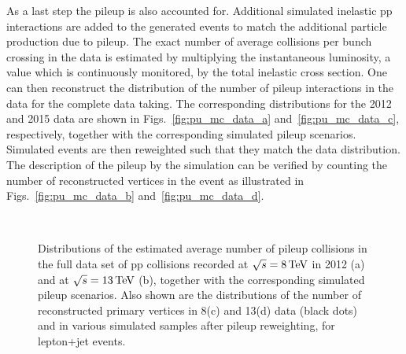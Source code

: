 As a last step the pileup is also accounted for.
Additional simulated inelastic pp interactions are added to the generated events to match the additional particle production due to pileup.
The exact number of average collisions per bunch crossing in the data is estimated by multiplying the instantaneous luminosity, a value which is continuously monitored, by the total inelastic cross section.
One can then reconstruct the distribution of the number of pileup interactions in the data for the complete data taking.
The corresponding distributions for the 2012 and 2015 data are shown in Figs.~\ref{fig:pu_mc_data_a} and~\ref{fig:pu_mc_data_c}, respectively, together with the corresponding simulated pileup scenarios.
Simulated events are then reweighted such that they match the data distribution. The description of the pileup by the simulation can be verified by counting the number of reconstructed vertices in the event as illustrated in Figs.~\ref{fig:pu_mc_data_b} and~\ref{fig:pu_mc_data_d}.\\

\begin{figure}[!htb]
\centering
{}
\\
\caption{Distributions of the estimated average number of pileup collisions in the full data set of pp collisions recorded at $\sqrt{s} = 8\,\text{Te\hspace{-.08em}V}$ in 2012 (a) and at $\sqrt{s} = 13\,\text{Te\hspace{-.08em}V}$ (b), together with the corresponding simulated pileup scenarios. Also shown are the distributions of the number of reconstructed primary vertices in 8\TeV (c) and 13\TeV (d) data (black dots) and in various simulated samples after pileup reweighting, for lepton+jet events.}
\label{fig:pu_mc_data}
\end{figure}

